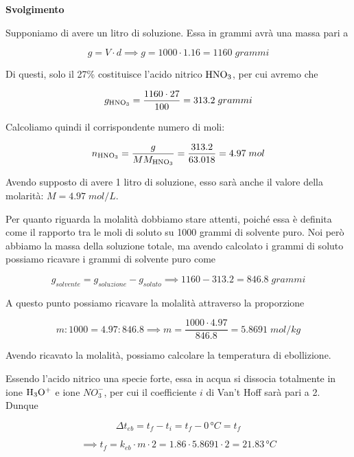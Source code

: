 \vspace{0.2cm}\large\textbf{Svolgimento}\normalsize

\vspace{0.2cm}Supponiamo di avere un litro di soluzione. Essa in grammi avrà una massa pari a

$$g=V \cdot d \implies g=1000 \cdot 1.16 = 1160\;grammi$$

Di questi, solo il 27\% costituisce l'acido nitrico $\rm HNO_3$, per cui avremo che

$$g_{\rm HNO_3}=\frac{1160 \cdot 27}{100}=313.2\;grammi$$

Calcoliamo quindi il corrispondente numero di moli:

$$n_{\rm HNO_3}=\frac{g}{MM_{\rm HNO_3}}
=\frac{313.2}{63.018}=4.97\;mol$$

Avendo supposto di avere 1 litro di soluzione, esso sarà anche il valore della molarità: $M=4.97\;mol/L$.

\vspace{0.2cm}Per quanto riguarda la molalità dobbiamo stare attenti, poiché essa è definita come il rapporto tra le moli di soluto su 1000 grammi di solvente puro. Noi però abbiamo la massa della soluzione totale, ma avendo calcolato i grammi di soluto possiamo ricavare i grammi di solvente puro come

$$g_{solvente}=g_{soluzione} - g_{soluto}
\implies
1160 -313.2=846.8\;grammi$$

A questo punto possiamo ricavare la molalità attraverso la proporzione

$$m:1000=4.97:846.8
\implies
m=\frac{1000 \cdot 4.97}{846.8}=5.8691\;mol/kg$$

Avendo ricavato la molalità, possiamo calcolare la temperatura di ebollizione.

Essendo l'acido nitrico una specie forte, essa in acqua si dissocia totalmente in ione $\rm H_3O^+$ e ione $NO_3^-$, per cui il coefficiente $i$ di Van't Hoff sarà pari a 2. Dunque

$$\Delta t_{eb}=t_f - t_i=t_f - 0\,\text{°}C=t_f$$

$$\implies t_f=k_{eb} \cdot m \cdot 2
=1.86 \cdot 5.8691 \cdot 2=21.83\,\text{°}C$$